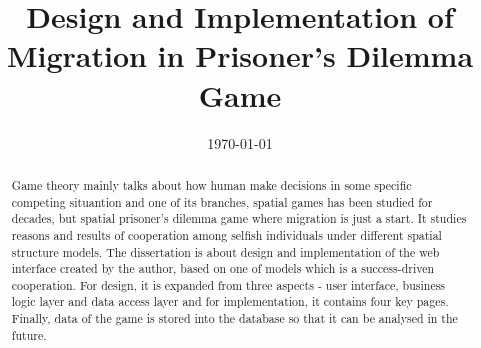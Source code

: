 \documentclass[twoside]{ecsthesis}      %
\begin{document}
\frontmatter
\title      {Design and Implementation of Migration in Prisoner's Dilemma Game}
\addresses  {\groupname\\\deptname\\\univname}
\date       {\today}
\subject    {}
\maketitle
\begin{abstract}
Game theory mainly talks about how human make decisions in some specific competing situantion and one of its branches, spatial games has been studied for decades, but spatial prisoner's dilemma game where migration is just a start. It studies reasons and results of cooperation among selfish individuals under different spatial structure models. The dissertation is about design and implementation of the  web interface created by the author, based on one of models which is a success-driven cooperation. For design, it is expanded from three aspects - user interface, business logic layer and data access layer and for implementation, it contains four key pages. Finally, data of the game is stored into the database so that it can be analysed in the future.
\end{abstract}
\tableofcontents
\listoffigures




\mainmatter






%
\backmatter


\end{document}
